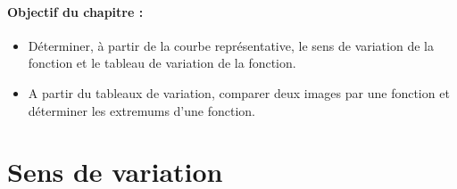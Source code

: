 \documentclass[10pt,a4paper,openany,twoside, eleve]{book}
\begin{document}
	\entetegal{}


	\vspace{-7mm}
	\paragraph*{Objectif du chapitre :}
	\begin{itemize}
		\vspace{-2mm}
		\setlength\itemsep{-1mm}
		\item Déterminer, à partir de la courbe représentative, le sens de variation de la fonction et le tableau de variation de la fonction.
		\item A partir du tableaux de variation, comparer deux images par une fonction et déterminer les extremums d'une fonction.
	\end{itemize}
	\vspace{-7mm}

	\section{Sens de variation}
\end{document}
